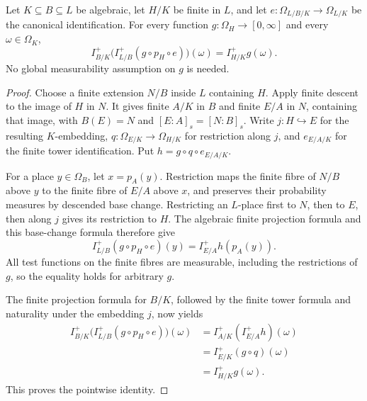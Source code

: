 \begin{lemma}
\label{lem:algebraic-tower-cylinders}
\leanok
{}
Let $K\subseteq B\subseteq L$ be algebraic, let $H/K$ be finite in
$L$, and let $e:\Omega_{L/B/K}\to\Omega_{L/K}$ be the canonical
identification. For every function $g:\Omega_H\to[0,\infty]$ and
every $\omega\in\Omega_K$,
\[
 I^+_{B/K}\bigl(I^+_{L/B}(g\circ p_H\circ e)\bigr)(\omega)
 = I^+_{H/K}g(\omega).
\]
No global measurability assumption on $g$ is needed.
\end{lemma}
\begin{proof}
Choose a finite extension $N/B$ inside $L$ containing $H$.
Apply finite descent to the image of $H$ in $N$. It gives finite
$A/K$ in $B$ and finite $E/A$ in $N$, containing that image, with
$B(E)=N$ and $[E:A]_s=[N:B]_s$.
Write $j:H\hookrightarrow E$ for the resulting $K$-embedding,
$q:\Omega_{E/K}\to\Omega_{H/K}$ for restriction along $j$, and
$e_{E/A/K}$ for the finite tower identification. Put
$h=g\circ q\circ e_{E/A/K}$.

For a place $y\in\Omega_B$, let $x=p_A(y)$. Restriction maps the
finite fibre of $N/B$ above $y$ to the finite fibre of $E/A$ above
$x$, and preserves their probability measures by descended base
change. Restricting an $L$-place first to $N$, then to $E$, then
along $j$ gives its restriction to $H$. The algebraic finite
projection formula and this base-change formula therefore give
\[
 I^+_{L/B}(g\circ p_H\circ e)(y)=I^+_{E/A}h(p_A(y)).
\]
All test functions on the finite fibres are measurable, including
the restrictions of $g$, so the equality holds for arbitrary $g$.

The finite projection formula for $B/K$, followed by the finite
tower formula and naturality under the embedding $j$, now yields
\[
 \begin{aligned}
 I^+_{B/K}\bigl(I^+_{L/B}(g\circ p_H\circ e)\bigr)(\omega)
 &= I^+_{A/K}(I^+_{E/A}h)(\omega)\\
 &= I^+_{E/K}(g\circ q)(\omega)\\
 &= I^+_{H/K}g(\omega).
 \end{aligned}
\]
This proves the pointwise identity.
\end{proof}

